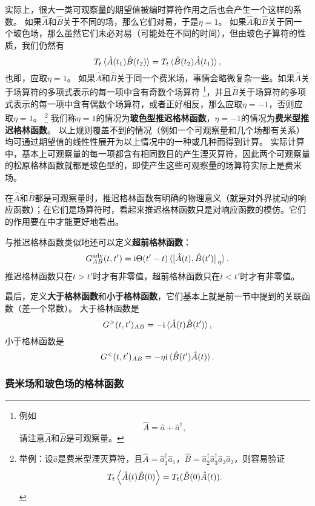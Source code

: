 \documentclass[hyperref, UTF8, a4paper]{ctexart}
\newcommand*{\ii}{\mathrm{i}}
\renewcommand{\autoref}{\prettyref}
\begin{document}
实际上，很大一类可观察量的期望值被编时算符作用之后也会产生一个这样的系数。
如果$\hat{A}$和$\hat{B}$关于不同的场，那么它们对易，于是$\eta=1$。
如果$\hat{A}$和$\hat{B}$关于同一个玻色场，那么虽然它们未必对易（可能处在不同的时间），但由玻色子算符的性质，我们仍然有
\[
    T_t \expval*{\hat{A}(t_1)\hat{B}(t_2)} = T_t \expval*{\hat{B}(t_2)\hat{A}(t_1)},
\]
也即，应取$\eta=1$。
如果$\hat{A}$和$\hat{B}$关于同一个费米场，事情会略微复杂一些。如果$\hat{A}$关于场算符的多项式表示的每一项中含有奇数个场算符%
\footnote{例如
\[
    \hat{A} = \hat{a}+\hat{a}^\dagger,
\]
请注意$\hat{A}$和$\hat{B}$是可观察量。}，并且$\hat{B}$关于场算符的多项式表示的每一项中含有偶数个场算符，或者正好相反，那么应取$\eta=-1$，否则应取$\eta=1$。%
\footnote{举例：设$\hat{a}$是费米型湮灭算符，且$\hat{A}=\hat{a}_1^\dagger \hat{a}_1$，$\hat{B}=\hat{a}_2^\dagger \hat{a}_3^\dagger \hat{a}_3 \hat{a}_2$，则容易验证
\[
    T_t \expval{\hat{A}(t)\hat{B}(0)} = T_t (\hat{B}(0) \hat{A}(t)).
\]
}%
我们称$\eta=1$的情况为\textbf{玻色型推迟格林函数}，$\eta=-1$的情况为\textbf{费米型推迟格林函数}。
以上规则覆盖不到的情况（例如一个可观察量和几个场都有关系）均可通过期望值的线性性展开为以上情况中的一种或几种而得到计算。
实际计算中，基本上可观察量的每一项都含有相同数目的产生湮灭算符，因此两个可观察量的松原格林函数就都是玻色型的，即使产生这些可观察量的场算符实际上是费米场。

在$\hat{A}$和$\hat{B}$都是可观察量时，推迟格林函数有明确的物理意义（就是对外界扰动的响应函数）；在它们是场算符时，看起来推迟格林函数只是对响应函数的模仿。它们的作用要在\autoref{sec:matsubara-theory}中才能更好地看出。

与推迟格林函数类似地还可以定义\textbf{超前格林函数}：
\begin{equation}
    G^\text{adv}_{AB} (t, t') = \ii \Theta(t' - t) \expval*{\comm*{\hat{A}(t)}{\hat{B}(t')}_\eta}.
\end{equation}
推迟格林函数只在$t>t'$时才有非零值，超前格林函数只在$t<t'$时才有非零值。

最后，定义\textbf{大于格林函数}和\textbf{小于格林函数}，它们基本上就是前一节中提到的关联函数（差一个常数）。
大于格林函数是
\begin{equation}
    G^> (t, t')_{AB} = - \ii \expval*{\hat{A}(t) \hat{B}(t')},
\end{equation}
小于格林函数是
\begin{equation}
    G^< (t, t')_{AB} = - \eta \ii \expval*{\hat{B}(t') \hat{A}(t)}.
\end{equation}

\subsubsection{费米场和玻色场的格林函数}\label{sec:field-green-function}
\end{document}
